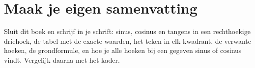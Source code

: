 \begin{oefeningen}




\end{oefeningen}


\ifzelfstudie
\section*{Maak je eigen samenvatting}
Sluit dit boek en schrijf in je schrift: sinus, cosinus en tangens in een rechthoekige driehoek, de tabel met de exacte waarden, het teken in elk kwadrant, de verwante hoeken, de grondformule, en hoe je alle hoeken bij een gegeven sinus of cosinus vindt. Vergelijk daarna met het kader.
\fi
